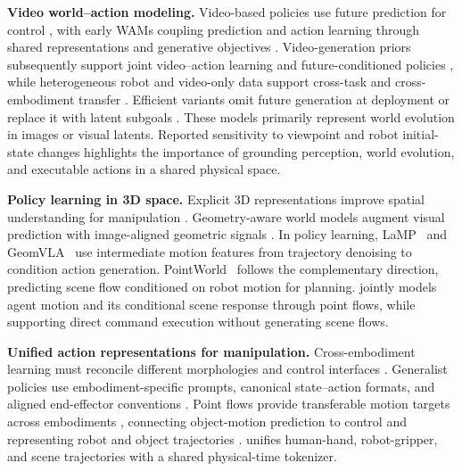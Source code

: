 \noindent\textbf{Video world--action modeling.}
Video-based policies use future prediction for control \citep{hu2024vpp},
with early WAMs coupling prediction and action learning through shared
representations and generative objectives
\citep{li2025uva,zhu2025uwm,cen2025worldvla,xu2025imaginative}.
Video-generation priors subsequently support joint video--action learning
and future-conditioned policies
\citep{genieenvisioner,shen2025videovla,bi2025motus,cosmospolicy,li2026lingbotva,wang2026eva},
while heterogeneous robot and video-only data support cross-task and
cross-embodiment transfer \citep{ye2026dreamzero,lingbotva2}.
Efficient variants omit future generation at deployment or replace it
with latent subgoals \citep{yuan2026fastwam,chen2026lawam}.
These models primarily represent world evolution in images or visual
latents. Reported sensitivity to viewpoint and robot initial-state changes
\citep{zhang2026wamgeneralization,hong2026walqr} highlights the importance
of grounding perception, world evolution, and executable actions in a
shared physical space.

\noindent\textbf{Policy learning in 3D space.}
Explicit 3D representations improve spatial understanding for manipulation
\citep{shridhar2023peract,ze2024threediffusion,zhen2024threedvla,qu2025spatialvla}.
Geometry-aware world models augment visual prediction with image-aligned
geometric signals \citep{zhen2025tesseract,guo2026xwam,zhao2026rynnworld}.
In policy learning, LaMP~\citep{wang2026lamp} and
GeomVLA~\citep{xiong2026geomvla} use intermediate motion features from
trajectory denoising to condition action generation. PointWorld~\citep{huang2026pointworld}
follows the complementary direction, predicting scene flow conditioned
on robot motion for planning. \method{} jointly models agent motion and
its conditional scene response through point flows, while supporting
direct command execution without generating scene flows.

\noindent\textbf{Unified action representations for manipulation.}
Cross-embodiment learning must reconcile different morphologies and
control interfaces \citep{chi2024umi}. Generalist policies use
embodiment-specific prompts, canonical state--action formats, and aligned
end-effector conventions
\citep{liu2024rdt,zheng2025xvla,yuan2026qwenrobotmanip,xiaomi2026robotics1}.
Point flows provide transferable motion targets across embodiments
\citep{yuan2024generalflow,bharadhwaj2024track2act,xu2024im2flow2act},
connecting object-motion prediction to control
\citep{zhi2025threedflowaction,dharmarajan2025dream2flow} and representing
robot and object trajectories \citep{huang2026pointworld,lin2026chronoflow}.
\method{} unifies human-hand, robot-gripper, and scene trajectories with
a shared physical-time tokenizer.

